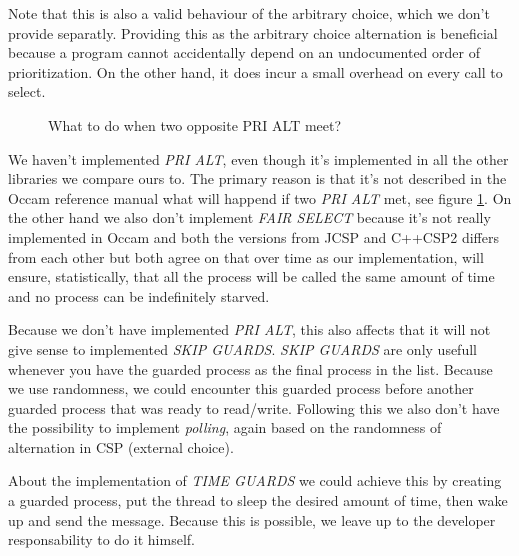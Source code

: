 \documentclass[a4paper,12pt]{article}
\begin{document}
Note that this is also a valid behaviour of the arbitrary choice, which we don't
provide separatly. Providing this as the arbitrary choice alternation is
beneficial because a program cannot accidentally depend on an undocumented
order of prioritization. On the other hand, it does incur a small overhead on
every call to select.

\begin{figure}[h]
  \begin{center}
  \end{center}
  \caption{What to do when two opposite PRI ALT meet?}
  \label{prialt}
\end{figure}

We haven't implemented {\it PRI ALT}\cite{occam}, even though it's implemented
in all the other libraries we compare ours to. The primary reason is that it's
not described in the Occam reference manual what will happend if two {\it PRI
ALT} met, see figure \ref{prialt}. On the other hand we also don't implement
{\it FAIR SELECT} because it's not really implemented in Occam and both the
versions from JCSP and C++CSP2 differs from each other but both agree on that
over time as our implementation, will ensure, statistically, that all the
process will be called the same amount of time and no process can be
indefinitely starved.

Because we don't have implemented {\it PRI ALT}, this also affects that it will
not give sense to implemented {\it SKIP GUARDS}. {\it SKIP GUARDS} are only
usefull whenever you have the guarded process as the final process in the list.
Because we use randomness, we could encounter this guarded process before
another guarded process that was ready to read/write. Following this we also
don't have the possibility to implement {\it polling}, again based on the
randomness of alternation in CSP (external choice).

About the implementation of {\it TIME GUARDS} we could achieve this by creating
a guarded process, put the thread to sleep the desired amount of time, then wake
up and send the message. Because this is possible, we leave up to the developer
responsability to do it himself.
\end{document}
